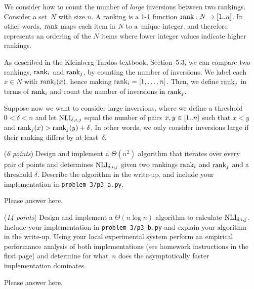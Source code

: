 \documentclass{hw}
\begin{document}
\begin{problem}
  We consider how to count the number of \emph{large} inversions between two
  rankings. Consider a set~$N$ with size $n$. 
  A ranking is a 1-1 function $\textnormal{rank}: N
  \rightarrow [1.. n]$. In other words, $\textnormal{rank}$ maps each item in $N$ to a unique
  integer, and therefore represents an ordering of the $N$ items where lower
  integer values indicate higher rankings. 

  As described in the Kleinberg-Tardos textbook, Section~5.3, we can compare two rankings, $\textnormal{rank}_i$ and $\textnormal{rank}_j$, by counting the number of
  inversions. We label each $x \in N$ with $\textnormal{rank}_i(x)$, hence making $\textnormal{rank}_i = [1, \dots ,n]$. Then, we define $\textnormal{rank}_j$ in terms of $\textnormal{rank}_i$ and count the number of inversions in $\textnormal{rank}_j$. 

  Suppose now we want to consider large inversions, where we define a threshold
  $0 < \delta < n$ and let $\textrm{NLI}_{\delta,i,j}$ equal the number of pairs
  $x,y \in [1.. n]$ such that $x < y$ and $\textnormal{rank}_j(x) > \textnormal{rank}_j(y) + \delta$. In other words, we only consider inversions large if their ranking differs by at
  least~$\delta$.
  \begin{subproblem}
    (\textit{6 points})
    Design and implement a $\Theta(n^2)$ algorithm that iterates over every pair
    of points and determines $\textrm{NLI}_{\delta,i,j}$ given two rankings
    $\textnormal{rank}_i$ and $\textnormal{rank}_j$ and a threshold $\delta$. Describe the algorithm in the write-up, and include your implementation in \texttt{problem\_3/p3\_a.py}.
  \end{subproblem}

\begin{solution}
Please answer here.
\end{solution}

  \begin{subproblem}
    (\textit{14 points})
    Design and implement a $\Theta(n\log n)$ algorithm to calculate
    $\textrm{NLI}_{\delta,i,j}$. Include your implementation in
    \texttt{problem\_3/p3\_b.py} and explain your algorithm in the write-up.
    Using your local experimental system perform
    an empirical performance analysis of both implementations (see homework
    instructions in the first page) and determine
    for what~$n$ does the asymptotically faster implementation dominates.
  \end{subproblem}

\begin{solution}
Please answer here.
\end{solution}

\end{problem}
\end{document}
